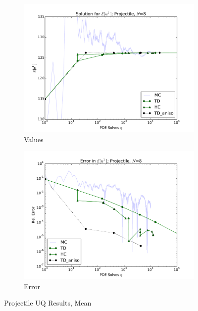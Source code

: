 \documentclass[11pt]{article}
\begin{document}
\begin{figure}[H]
    \centering
    \begin{subfigure}[b]{0.49 \textwidth}
      \includegraphics[width=\textwidth]{../graphics/projectile_solns_aniso}
      \caption{Values}
      \label{atn vals hdmr}
  \end{subfigure}
\begin{subfigure}[b]{0.49 \textwidth}
\centering
      \includegraphics[width=\textwidth]{../graphics/projectile_errs_aniso}
      \caption{Error}
      \label{atn errs hdmr}
    \end{subfigure}
  \caption{Projectile UQ Results, Mean}
  \label{proj anis mean}
  \end{figure}
\end{document}
